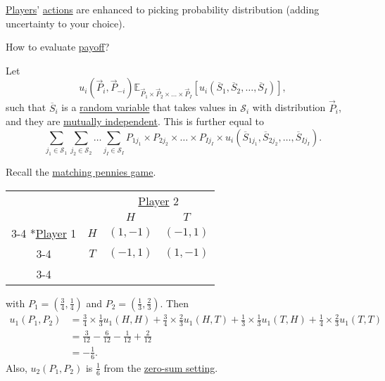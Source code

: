 \hyperref[def:player]{Players}' \hyperref[def:strategy]{actions} are enhanced to picking probability distribution (adding uncertainty to your choice).

\begin{problem}
How to evaluate \hyperref[def:reward]{payoff}?
\end{problem}
\begin{answer}
	Let
	\[
		u_{i}(\overrightarrow{P}_i, \overrightarrow{P}_{-i})
		\mathbb{E}_{\overrightarrow{P}_{1}\times \overrightarrow{P}_2 \times \ldots \times \overrightarrow{P}_I}\left[ u_{i}\left(\overline{S}_1, \overline{S}_2, \ldots , \overline{S}_I\right)\right],
	\]
	such that \(\overline{S}_i\) is a \hyperref[def:random-variable]{random variable} that takes values in \(\mathcal{S}_i\) with
	distribution \(\overrightarrow{P}_i\), and they are \hyperref[def:independent]{mutually independent}. This is further equal to
	\[
		\sum\limits_{j_1\in \mathcal{S}_1 }\sum\limits_{j_2\in \mathcal{S}_2}\ldots \sum\limits_{j_I\in \mathcal{S}_I }P_{1j_1}\times P_{2j_2}\times \ldots \times P_{Ij_I}\times u_{i}\left(\overline{S}_{1j_1}, \overline{S}_{2j_2}, \ldots , \overline{S}_{Ij_I}\right).
	\]
\end{answer}

\begin{eg}
	Recall the \hyperref[eg:matching-pennies]{matching pennies game}.
	\begin{table}[H]
		\centering
		\setlength{\extrarowheight}{2pt}
		\begin{tabular}{cc|c|c|}
			                                               & \multicolumn{1}{c}{} & \multicolumn{2}{c}{\hyperref[def:player]{Player} 2}                           \\
			                                               & \multicolumn{1}{c}{} & \multicolumn{1}{c}{$H$}                             & \multicolumn{1}{c}{$T$} \\\cline{3-4}
			\multirow{2}*{\hyperref[def:player]{Player} 1} & $H$                  & $(1, -1)$                                           & $(-1, 1)$               \\\cline{3-4}
			                                               & $T$                  & $(-1, 1)$                                           & $(1, -1)$               \\\cline{3-4}
		\end{tabular}
	\end{table}
	with \(P_1 = (\frac{3}{4}, \frac{1}{4})\) and \(P_2 = (\frac{1}{3}, \frac{2}{3})\). Then
	\[
		\begin{split}
			u_1(P_1, P_2) &= \frac{3}{4}\times \frac{1}{3} u_1(H, H) + \frac{3}{4}\times \frac{2}{3}u_1(H, T) + \frac{1}{3}\times \frac{1}{3}u_1(T, H)+\frac{1}{4}\times \frac{2}{3}u_1(T, T)\\
			&= \frac{3}{12} - \frac{6}{12} - \frac{1}{12} + \frac{2}{12}\\
			&= -\frac{1}{6}.
		\end{split}
	\]
	Also, \(u_2(P_1, P_2)\) is \(\frac{1}{6}\) from the \hyperref[def:zero-sum-game]{zero-sum setting}.
\end{eg}

